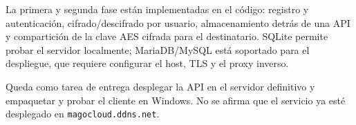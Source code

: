 \documentclass[12pt,a4paper]{article}
\begin{document}
La primera y segunda fase están implementadas en el código: registro y autenticación, cifrado/descifrado por usuario, almacenamiento detrás de una API y compartición de la clave AES cifrada para el destinatario. SQLite permite probar el servidor localmente; MariaDB/MySQL está soportado para el despliegue, que requiere configurar el host, TLS y el proxy inverso.

Queda como tarea de entrega desplegar la API en el servidor definitivo y empaquetar y probar el cliente en Windows. No se afirma que el servicio ya esté desplegado en \texttt{magocloud.ddns.net}.
\end{document}
